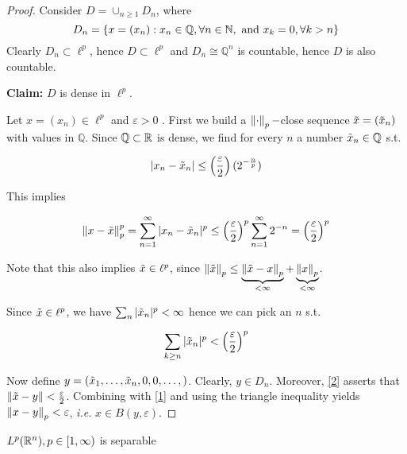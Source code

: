\documentclass{article}
\begin{document}
\begin{proof}
	Consider \(D = \cup_{n\geq 1} D_n\), where  
	\[ D_n = \{x=(x_n): x_n \in \mathbb{Q}, \forall n \in \mathbb{N}, \ \text{and} \ x_k=0, \forall k >n\}\]
 Clearly $D_n \subset \ell^p$, hence $D\subset \ell^p$ and $D_n \cong \mathbb{Q}^n$ is countable, hence $D$ is also countable.   

\textbf{Claim:} $D$ is dense in $\ell^p$.  

Let $x = (x_n) \in \ell^p$ and $\varepsilon >0$ . First we build a $\left\|{\cdot}\right\|_p-$close sequence $\Tilde{x}=(\Tilde{x}_n)$ with values in $\mathbb{Q}$. Since $\mathbb{Q} \subset \mathbb{R}$ is dense, we find for every $n$ a number $\tilde{x}_n \in \mathbb{Q}$ s.t.  

$$
|x_n-\Tilde{x}_n| \leq \left(\frac{\varepsilon}{2}\right) (2^{-\frac{n}{p}})
$$  

This implies  

\begin{equation}
\label{1}
    \left\|{x-\Tilde{x}}\right\|_p^p = \sum_{n=1}^{\infty} |x_n-\Tilde{x}_n|^p \leq \left(\frac{\varepsilon}{2}\right)^p \sum_{n=1}^{\infty} 2^{-n}=\left(\frac{\varepsilon}{2}\right)^p
\end{equation}

Note that this also implies $\Tilde{x} \in \ell^p$, since $\left\|{\Tilde{x}}\right\|_p \leq \underbrace{\left\|{\Tilde{x}-x}\right\|_p}_{<\infty}+\underbrace{\left\|{x}\right\|_p}_{<\infty}$.  

Since $\Tilde{x} \in \ell^p$, we have $\sum_n |\Tilde{x}_n|^p < \infty$ hence we can pick an $n$ s.t.  

\begin{equation}
\label{2}
    \sum_{k\geq n} |\Tilde{x}_n|^p < \left(\frac{\varepsilon}{2}\right)^p
\end{equation}

Now define $y = (\Tilde{x}_1, \ldots, \Tilde{x}_n, 0, 0, \ldots,)$. Clearly, $y \in D_n$. Moreover, \cref{2} asserts that $\left\|{\Tilde{x}-y}\right\| < \frac{\varepsilon}{2}$. Combining with \cref{1} and using the triangle inequality yields $\left\|{x-y}\right\|_p < \varepsilon$, \textit{i.e.} $x\in B(y, \varepsilon)$.  
\end{proof}  

\begin{proposition}
    $L^p(\mathbb{R}^n), p \in [1, \infty)$ is separable
\end{proposition}  
\end{document}
